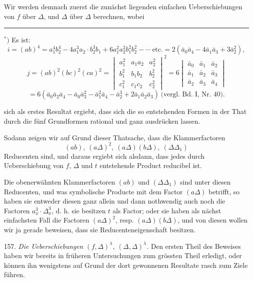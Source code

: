 Wir werden demnach zuerst die zunächst liegenden einfachen Ueberschiebungen von $f$ über $\Delta$, und $\Delta$ über $\Delta$ berechnen, wobei

\par\noindent\rule{4cm}{0.4pt}\par
\noindent $^{\ast})$ Es ist:
\[
i=(ab)^4=a_1^4b_2^4-4a_1^3a_2\cdot b_2^3b_1+6a_1^2a_2^2b_1^2b_2^2-\cdots\ \text{etc.}=2(\bar a_0\bar a_4-4\bar a_1\bar a_3+3\bar a_2^2),
\]
\[
j=(ab)^2(bc)^2(ca)^2=\begin{vmatrix}a_1^2 & a_1a_2 & a_2^2\\ b_1^2 & b_1b_2 & b_2^2\\ c_1^2 & c_1c_2 & c_2^2\end{vmatrix}^2=6\begin{vmatrix}\bar a_0 & \bar a_1 & \bar a_2\\ \bar a_1 & \bar a_2 & \bar a_3\\ \bar a_2 & \bar a_3 & \bar a_4\end{vmatrix}
\]
\[
=6(\bar a_0\bar a_2\bar a_4-\bar a_0\bar a_3^2-\bar a_1^2\bar a_4-\bar a_2^3+2\bar a_1\bar a_2\bar a_3)\ \text{(vergl. Bd. I, Nr. 40).}
\]


sich als erstes Resultat ergiebt, dass sich die so entstehenden Formen in der That durch die fünf Grundformen rational und ganz ausdrücken lassen.

Sodann zeigen wir auf Grund dieser Thatsache, dass die Klammerfactoren
\[
(ab),\ (a\Delta)^2,\ (a\Delta)(b\Delta),\ (\Delta\Delta_1)
\]
Reducenten sind, und daraus ergiebt sich alsdann, dass jedes durch Ueberschiebung von $f$, $\Delta$ und $t$ entstehende Product reducibel ist.

Die obenerwähnten Klammerfactoren $(ab)$ und $(\Delta\Delta_1)$ sind unter diesen Reducenten, und was symbolische Producte mit dem Factor $(a\Delta)$ betrifft, so haben sie entweder diesen ganz allein und dann nothwendig auch noch die Factoren $a_x^3\cdot\Delta_x^3$, d. h. sie besitzen $t$ als Factor; oder sie haben als nächst einfachsten Fall die Factoren $(a\Delta)^2$, resp. $(a\Delta)(b\Delta)$, und von diesen wollen wir ja gerade beweisen, dass sie Reducenteneigenschaft besitzen.

157. \textit{Die Ueberschiebungen $(f,\Delta)^\lambda$, $(\Delta,\Delta)^\lambda$.} Den ersten Theil des Beweises haben wir bereits in früheren Untersuchungen zum grössten Theil erledigt, oder können ihn wenigstens auf Grund der dort gewonnenen Resultate rasch zum Ziele führen.

